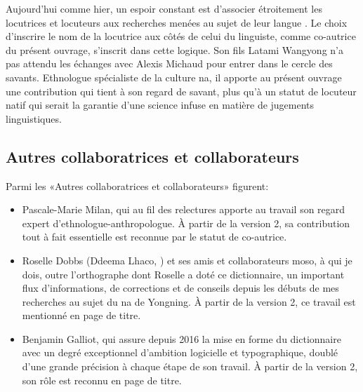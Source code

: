 
Aujourd'hui comme hier, un espoir constant est d'associer étroitement les locutrices et locuteurs aux recherches menées au sujet de leur langue \textcite{bouquiauxetal1971}. Le choix d'inscrire le nom de la locutrice aux côtés de celui du linguiste, comme co-autrice du présent ouvrage, s'inscrit dans cette logique. Son fils Latami Wangyong n'a pas attendu les échanges avec Alexis Michaud pour entrer dans le cercle des savants. Ethnologue spécialiste de la culture na, il apporte au présent ouvrage une contribution qui tient à son regard de savant, plus qu'à un statut de locuteur natif qui serait la garantie d'une science infuse en matière de jugements linguistiques.

\subsection{Autres collaboratrices et collaborateurs}

Parmi les «Autres collaboratrices et collaborateurs» figurent:

\begin{itemize}
    \item Pascale-Marie Milan, qui au fil des relectures apporte au travail son regard expert d'ethnologue-anthropologue. À partir de la version 2, sa contribution tout à fait essentielle est reconnue par le statut de co-autrice.
    \item Roselle Dobbs (Ddeema Lhaco, ) et ses amis et collaborateurs moso, à qui je dois, outre l'orthographe dont Roselle a doté ce dictionnaire, un important flux d’informations, de corrections et de conseils depuis les débuts de mes recherches au sujet du na de Yongning. À partir de la version 2, ce travail est mentionné en page de titre.
    \item Benjamin Galliot, qui assure depuis 2016 la mise en forme du dictionnaire avec un degré exceptionnel d'ambition logicielle et typographique, doublé d'une grande précision à chaque étape de son travail. À partir de la version 2, son rôle est reconnu en page de titre.
\end{itemize}


